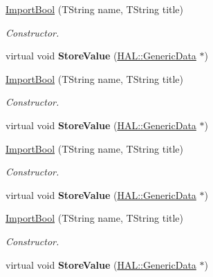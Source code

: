 \begin{DoxyCompactItemize}
\item 
\hyperlink{class_h_a_l_1_1_algorithms_1_1_import_bool_a060a260af56afe85c10ff992a0a8b3fa}{Import\+Bool} (T\+String name, T\+String title)
\begin{DoxyCompactList}\small\item\em Constructor. \end{DoxyCompactList}\item 
\hypertarget{class_h_a_l_1_1_algorithms_1_1_import_bool_a5cb75ed42fe19b3c406d8defbf8aaa4f}{virtual void {\bfseries Store\+Value} (\hyperlink{class_h_a_l_1_1_generic_data}{H\+A\+L\+::\+Generic\+Data} $\ast$)}\label{class_h_a_l_1_1_algorithms_1_1_import_bool_a5cb75ed42fe19b3c406d8defbf8aaa4f}

\item 
\hyperlink{class_h_a_l_1_1_algorithms_1_1_import_bool_a060a260af56afe85c10ff992a0a8b3fa}{Import\+Bool} (T\+String name, T\+String title)
\begin{DoxyCompactList}\small\item\em Constructor. \end{DoxyCompactList}\item 
\hypertarget{class_h_a_l_1_1_algorithms_1_1_import_bool_a5cb75ed42fe19b3c406d8defbf8aaa4f}{virtual void {\bfseries Store\+Value} (\hyperlink{class_h_a_l_1_1_generic_data}{H\+A\+L\+::\+Generic\+Data} $\ast$)}\label{class_h_a_l_1_1_algorithms_1_1_import_bool_a5cb75ed42fe19b3c406d8defbf8aaa4f}

\item 
\hyperlink{class_h_a_l_1_1_algorithms_1_1_import_bool_a060a260af56afe85c10ff992a0a8b3fa}{Import\+Bool} (T\+String name, T\+String title)
\begin{DoxyCompactList}\small\item\em Constructor. \end{DoxyCompactList}\item 
\hypertarget{class_h_a_l_1_1_algorithms_1_1_import_bool_a5cb75ed42fe19b3c406d8defbf8aaa4f}{virtual void {\bfseries Store\+Value} (\hyperlink{class_h_a_l_1_1_generic_data}{H\+A\+L\+::\+Generic\+Data} $\ast$)}\label{class_h_a_l_1_1_algorithms_1_1_import_bool_a5cb75ed42fe19b3c406d8defbf8aaa4f}

\item 
\hyperlink{class_h_a_l_1_1_algorithms_1_1_import_bool_a060a260af56afe85c10ff992a0a8b3fa}{Import\+Bool} (T\+String name, T\+String title)
\begin{DoxyCompactList}\small\item\em Constructor. \end{DoxyCompactList}\item 
\hypertarget{class_h_a_l_1_1_algorithms_1_1_import_bool_a5cb75ed42fe19b3c406d8defbf8aaa4f}{virtual void {\bfseries Store\+Value} (\hyperlink{class_h_a_l_1_1_generic_data}{H\+A\+L\+::\+Generic\+Data} $\ast$)}\label{class_h_a_l_1_1_algorithms_1_1_import_bool_a5cb75ed42fe19b3c406d8defbf8aaa4f}


\end{DoxyCompactItemize}
